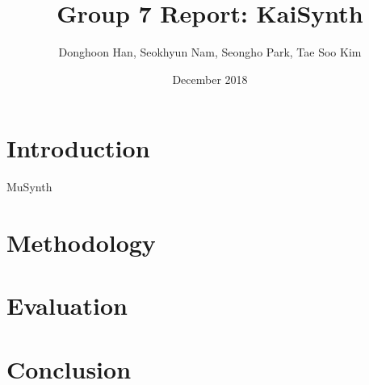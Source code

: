 \documentclass{article}
\title{Group 7 Report: KaiSynth}
\author{Donghoon Han, Seokhyun Nam, Seongho Park, Tae Soo Kim}
\date{December 2018}
\begin{document}
\maketitle

\section{Introduction}
MuSynth \citep{musynth}

\section{Methodology}

\section{Evaluation}

\section{Conclusion}



\end{document}
